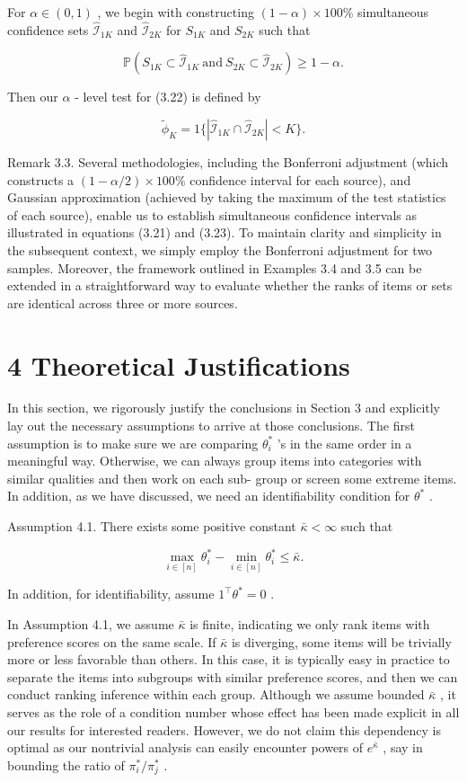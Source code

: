 For \(\alpha \in (0,1)\) , we begin with constructing
\((1 - \alpha)\times 100\%\) simultaneous confidence sets
\(\widehat{\mathcal{I}}_{1K}\) and \(\widehat{\mathcal{I}}_{2K}\) for
\(S_{1K}\) and \(S_{2K}\) such that

\[
\mathbb{P}\left(S_{1K}\subset \widehat{\mathcal{I}}_{1K}\mathrm{~and~}S_{2K}\subset \widehat{\mathcal{I}}_{2K}\right)\geq 1 - \alpha . \tag{3.23}
\]

Then our \(\alpha\) - level test for (3.22) is defined by

\[
\widetilde{\phi}_{K} = 1\{|\widehat{\mathcal{I}}_{1K}\cap \widehat{\mathcal{I}}_{2K}|< K\} .
\]

Remark 3.3. Several methodologies, including the Bonferroni adjustment
(which constructs a \((1 - \alpha /2)\times 100\%\) confidence interval
for each source), and Gaussian approximation (achieved by taking the
maximum of the test statistics of each source), enable us to establish
simultaneous confidence intervals as illustrated in equations (3.21) and
(3.23). To maintain clarity and simplicity in the subsequent context, we
simply employ the Bonferroni adjustment for two samples. Moreover, the
framework outlined in Examples 3.4 and 3.5 can be extended in a
straightforward way to evaluate whether the ranks of items or sets are
identical across three or more sources.

\section{4 Theoretical Justifications}\label{theoretical-justifications}

In this section, we rigorously justify the conclusions in Section 3 and
explicitly lay out the necessary assumptions to arrive at those
conclusions. The first assumption is to make sure we are comparing
\(\theta_{i}^{*}\) 's in the same order in a meaningful way. Otherwise,
we can always group items into categories with similar qualities and
then work on each sub- group or screen some extreme items. In addition,
as we have discussed, we need an identifiability condition for
\(\theta^{*}\) .

Assumption 4.1. There exists some positive constant
\(\bar{\kappa} < \infty\) such that

\[
\max_{i\in [n]}\theta_{i}^{*} - \min_{i\in [n]}\theta_{i}^{*}\leq \bar{\kappa}.
\]

In addition, for identifiability, assume \(1^{\top}\theta^{*} = 0\) .

In Assumption 4.1, we assume \(\bar{\kappa}\) is finite, indicating we
only rank items with preference scores on the same scale. If
\(\bar{\kappa}\) is diverging, some items will be trivially more or less
favorable than others. In this case, it is typically easy in practice to
separate the items into subgroups with similar preference scores, and
then we can conduct ranking inference within each group. Although we
assume bounded \(\bar{\kappa}\) , it serves as the role of a condition
number whose effect has been made explicit in all our results for
interested readers. However, we do not claim this dependency is optimal
as our nontrivial analysis can easily encounter powers of
\(e^{\bar{\kappa}}\) , say in bounding the ratio of
\(\pi_{i}^{*} / \pi_{j}^{*}\) .

